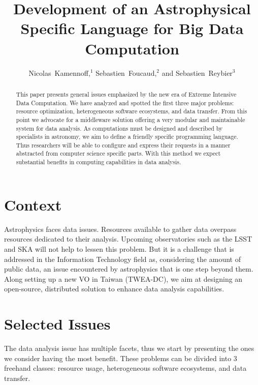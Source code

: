 

\resetcounters


	\title{Development of an Astrophysical Specific Language for Big Data Computation}
	\author{Nicolas~Kamennoff,$^1$ Sebastien~Foucaud,$^2$ and Sebastien~Reybier$^3$}


	\begin{abstract}
		This paper presents general issues emphasized by the new era of Extreme Intensive Data Computation. We have analyzed and spotted the first three major problems: resource optimization, heterogeneous software ecosystems, and data transfer. From this point we advocate for a middleware solution offering a very modular and maintainable system for data analysis. As computations must be designed and described by specialists in astronomy, we aim to define a friendly specific programming language. Thus researchers will be able to configure and express their requests in a manner abstracted from computer science specific parts. With this method we expect substantial benefits in computing capabilities in data analysis.
	\end{abstract}

	\section{Context}
		Astrophysics faces data issues. Resources available to gather data overpass resources dedicated to their analysis. Upcoming observatories such as the LSST and SKA will not help to lessen this problem. But it is a challenge that is addressed in the Information Technology field as, considering the amount of public data, an issue encountered by astrophysics that is one step beyond them. Along setting up a new VO in Taiwan (TWEA-DC), we aim at designing an open-source, distributed solution to enhance data analysis capabilities.

	\section{Selected Issues}
		\label{BLINK_ISSUES}
		The data analysis issue has multiple facets, thus we start by presenting the ones we consider having the most benefit. These problems can be divided into 3 freehand classes: resource usage, heterogeneous software ecosystems, and data transfer.
		
